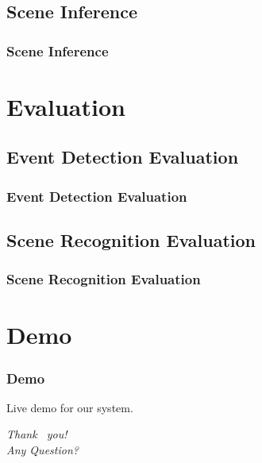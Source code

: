 \documentclass[xcolor=table,slidestop,compress,mathserif]{beamer}
\begin{document}
\subsection{Scene Inference}
\begin{frame}
	\frametitle{Scene Inference}	
\end{frame}
\section{Evaluation}
\subsection{Event Detection Evaluation}
\begin{frame}
	\frametitle{Event Detection Evaluation}
\end{frame}
\subsection{Scene Recognition Evaluation}
\begin{frame}
	\frametitle{Scene Recognition Evaluation}
\end{frame}
\section{Demo}
\begin{frame}
	\frametitle{Demo}
	Live demo for our system. 
\end{frame}
\begin{frame}
  \begin{center}
    {\huge \emph{{Thank  ~you!
          \\   \vspace{1cm} Any Question?}}}
  \end{center}
\end{frame}
\end{document}
